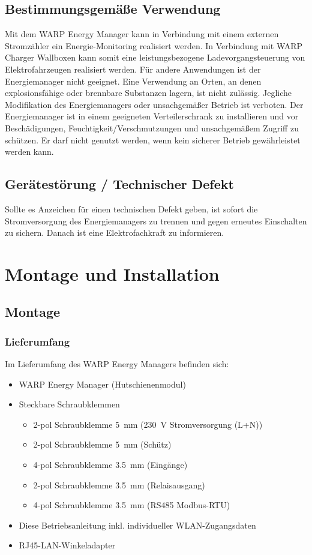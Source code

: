 \documentclass[a4paper,10pt]{article}
\begin{document}
\begin{multicols*}{2}
	\subsection{Bestimmungsgemäße Verwendung}
	Mit dem WARP Energy Manager kann in Verbindung mit einem externen
	Stromzähler ein Energie-Monitoring realisiert werden. In Verbindung mit WARP
	Charger Wallboxen kann somit eine leistungsbezogene Ladevorgangsteuerung von
	Elektrofahrzeugen realisiert werden. Für andere Anwendungen ist der
	Energiemanager nicht geeignet. Eine Verwendung
	an Orten, an denen explosionsfähige oder brennbare Substanzen lagern, ist nicht
	zulässig. Jegliche Modifikation des Energiemanagers oder unsachgemäßer Betrieb ist verboten.
	Der Energiemanager ist in einem geeigneten Verteilerschrank zu installieren
	und vor Beschädigungen, Feuchtigkeit/Verschmutzungen und unsachgemäßem
	Zugriff zu schützen. Er darf nicht genutzt werden, wenn kein sicherer Betrieb
	gewährleistet werden kann.

	\subsection{Gerätestörung / Technischer Defekt}
	Sollte es Anzeichen für einen technischen Defekt geben, ist sofort die
	Stromversorgung des Energiemanagers zu trennen und gegen erneutes Einschalten zu
	sichern. Danach ist eine Elektrofachkraft zu informieren.

	\newpage
	\section{Montage und Installation}
	\subsection{Montage}
	\subsubsection{Lieferumfang}
	Im Lieferumfang des WARP Energy Managers befinden sich:
	\begin{itemize}
		\item WARP Energy Manager (Hutschienenmodul)
		\item Steckbare Schraubklemmen
		\begin{itemize}
			\item 2-pol Schraubklemme \SI{5}{\milli\meter} (\SI{230}{\volt} Stromversorgung (L+N))
			\item 2-pol Schraubklemme \SI{5}{\milli\meter} (Schütz)
			\item 4-pol Schraubklemme \SI{3.5}{\milli\meter} (Eingänge)
			\item 2-pol Schraubklemme \SI{3.5}{\milli\meter} (Relaisausgang)
			\item 4-pol Schraubklemme \SI{3.5}{\milli\meter} (RS485 Modbus-RTU)
		\end{itemize}
		\item Diese Betriebsanleitung inkl. individueller WLAN-Zugangsdaten
		\item RJ45-LAN-Winkeladapter
	\end{itemize}


\end{multicols*}
\end{document}
